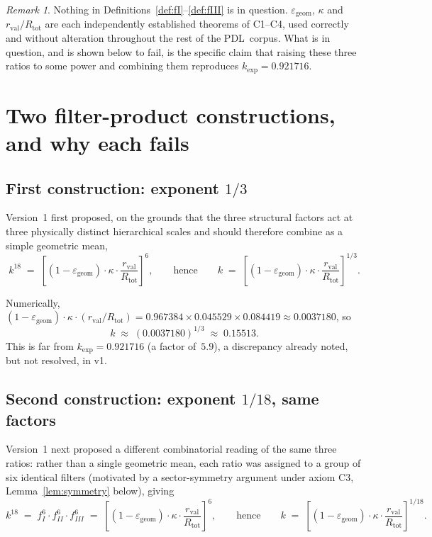 \documentclass[12pt,a4paper]{article}
\theoremstyle{plain}
\theoremstyle{definition}
\theoremstyle{remark}
\newtheorem{remark}[theorem]{Remark}
\newenvironment{negativebox}[1][]{%
\begin{tcolorbox}[negativestyle,title={Negative Result\ifx\relax#1\relax\else: #1\fi}]}{\end{tcolorbox}}
\newcommand{\PDL}{\textsc{PDL}}
\newcommand{\kap}{\kappa}
\newcommand{\rval}{r_{\mathrm{val}}}
\newcommand{\Rtot}{R_{\mathrm{tot}}}
\newcommand{\egeom}{\varepsilon_{\mathrm{geom}}}
\begin{document}
\begin{remark}
Nothing in Definitions~\ref{def:fI}--\ref{def:fIII} is in question. $\egeom$, $\kap$ and $\rval/\Rtot$ are each independently established theorems of C1--C4, used correctly and without alteration throughout the rest of the \PDL\ corpus. What is in question, and is shown below to fail, is the specific claim that raising these three ratios to some power and combining them reproduces $k_{\exp}=0.921716$.
\end{remark}

\section{Two filter-product constructions, and why each fails}
\label{sec:product}

\subsection{First construction: exponent \texorpdfstring{$1/3$}{1/3}}

Version~1 first proposed, on the grounds that the three structural factors act at three physically distinct hierarchical scales and should therefore combine as a simple geometric mean,
\[
k^{18} \;=\; \left[(1-\egeom)\cdot\kap\cdot\frac{\rval}{\Rtot}\right]^{6}, \qquad\text{hence}\qquad k \;=\; \left[(1-\egeom)\cdot\kap\cdot\frac{\rval}{\Rtot}\right]^{1/3}.
\]

\begin{negativebox}[Exponent $1/3$ does not reproduce the target]
\label{neg:onethird}
Numerically, $(1-\egeom)\cdot\kap\cdot(\rval/\Rtot)=0.967384\times0.045529\times0.084419\approx0.0037180$, so
\[
k \;\approx\; (0.0037180)^{1/3} \;\approx\; 0.15513.
\]
This is far from $k_{\exp}=0.921716$ (a factor of~$5.9$), a discrepancy already noted, but not resolved, in v1.
\end{negativebox}

\subsection{Second construction: exponent \texorpdfstring{$1/18$}{1/18}, same factors}

Version~1 next proposed a different combinatorial reading of the same three ratios: rather than a single geometric mean, each ratio was assigned to a group of six identical filters (motivated by a sector-symmetry argument under axiom C3, Lemma~\ref{lem:symmetry} below), giving
\[
k^{18} \;=\; f_I^6\cdot f_{II}^6\cdot f_{III}^6 \;=\; \left[(1-\egeom)\cdot\kap\cdot\frac{\rval}{\Rtot}\right]^{6}, \qquad\text{hence}\qquad k \;=\; \left[(1-\egeom)\cdot\kap\cdot\frac{\rval}{\Rtot}\right]^{1/18}.
\]
\end{document}
